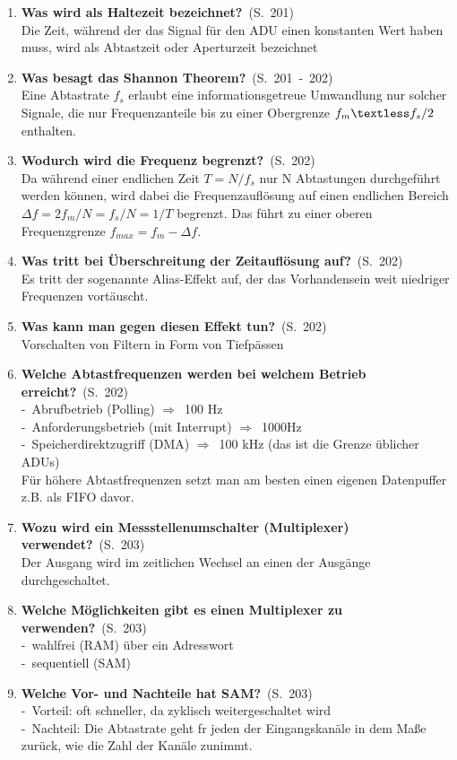 \documentclass[a4paper,12pt]{article}
\newcommand{\question}[3]{\pagebreak[3]\item {\textbf{#1?}}\ (S.\ #2)#3}
\newcommand{\catchword}[1]{\\-\ #1}
\newcommand{\normaltext}[1]{\\#1}
\newcommand{\resultol}[1]{$\Rightarrow$\ #1}
\newcommand{\page}[1]{#1}
\newcommand{\pages}[2]{#1\ -\ #2}
\begin{document}
\begin{enumerate}
  \question{Was wird als Haltezeit bezeichnet}{\page{201}}
  {
    \normaltext{Die Zeit, während der das Signal für den ADU einen konstanten Wert haben muss,
                wird als Abtastzeit oder Aperturzeit bezeichnet}
  }

  \question{Was besagt das Shannon Theorem}{\pages{201}{202}}
  {
    \normaltext{Eine Abtastrate $f_s$ erlaubt eine informationsgetreue Umwandlung nur solcher Signale, die
                nur Frequenzanteile bis zu einer Obergrenze $f_m \textless f_s/2$ enthalten.}
  }

  \question{Wodurch wird die Frequenz begrenzt}{\page{202}}
  {
    \normaltext{Da während einer endlichen Zeit $ T = N/f_s $  nur N Abtastungen durchgeführt
                werden können, wird dabei die Frequenzauflösung auf einen endlichen Bereich
                $ \Delta f = 2f_m/N = f_s/N = 1/T $ begrenzt. Das führt zu einer oberen
                Frequenzgrenze $ f_{max} = f_m - \Delta f $.  }
  }

  \question{Was tritt bei Überschreitung der Zeitauflösung auf}{\page{202}}
  {
    \normaltext{Es tritt der sogenannte Alias-Effekt auf, der das Vorhandensein weit niedriger
                Frequenzen vortäuscht.}
  }

  \question{Was kann man gegen diesen Effekt tun}{\page{202}}
  {
    \normaltext{Vorschalten von Filtern in Form von Tiefpässen}
  }

  \question{Welche Abtastfrequenzen werden bei welchem Betrieb erreicht}{\page{202}}
  {
    \catchword{Abrufbetrieb (Polling) \resultol{100 Hz}}
    \catchword{Anforderungsbetrieb (mit Interrupt) \resultol{1000Hz}}
    \catchword{Speicherdirektzugriff (DMA) \resultol 100 kHz (das ist die Grenze üblicher ADUs)}
    \normaltext{Für höhere Abtastfrequenzen setzt man am besten einen eigenen Datenpuffer z.B. als
                FIFO davor.}
  }

  \question{Wozu wird ein Messstellenumschalter (Multiplexer) verwendet}{\page{203}}
  {
    \normaltext{Der Ausgang wird im zeitlichen Wechsel an einen der Ausgänge durchgeschaltet.}
  }

  \question{Welche Möglichkeiten gibt es einen Multiplexer zu verwenden}{\page{203}}
  {
    \catchword{wahlfrei (RAM) über ein Adresswort}
    \catchword{sequentiell (SAM)}
  }

  \question{Welche Vor- und Nachteile hat SAM}{\page{203}}
  {
    \catchword{Vorteil: oft schneller, da zyklisch weitergeschaltet wird}
    \catchword{Nachteil: Die Abtastrate geht fr jeden der Eingangskanäle in dem Maße zurück, wie die Zahl der 
               Kanäle zunimmt.}
  }


\end{enumerate}
\end{document}
